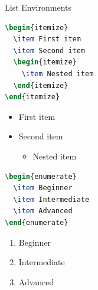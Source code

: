 \documentclass{beamer}
\begin{document}
\begin{frame}[fragile]{List Environments}
  \begin{minipage}{0.5\linewidth}
\begin{lstlisting}[language=TeX]
\begin{itemize}
  \item First item
  \item Second item
  \begin{itemize}
    \item Nested item
  \end{itemize}
\end{itemize}
\end{lstlisting}
  \end{minipage}\hspace{1cm}
  \begin{minipage}{0.3\linewidth}
    \begin{itemize}
      \item First item
      \item Second item
      \begin{itemize}
        \item Nested item
      \end{itemize}
    \end{itemize}
  \end{minipage}

  \medskip
  \pause

  \begin{minipage}{0.5\linewidth}
\begin{lstlisting}[language=TeX]
\begin{enumerate}
  \item Beginner
  \item Intermediate
  \item Advanced
\end{enumerate}
\end{lstlisting}
  \end{minipage}\hspace{1cm}
  \begin{minipage}{0.3\linewidth}
    \begin{enumerate}
      \item Beginner
      \item Intermediate
      \item Advanced
    \end{enumerate}
  \end{minipage}
\end{frame}
\end{document}
